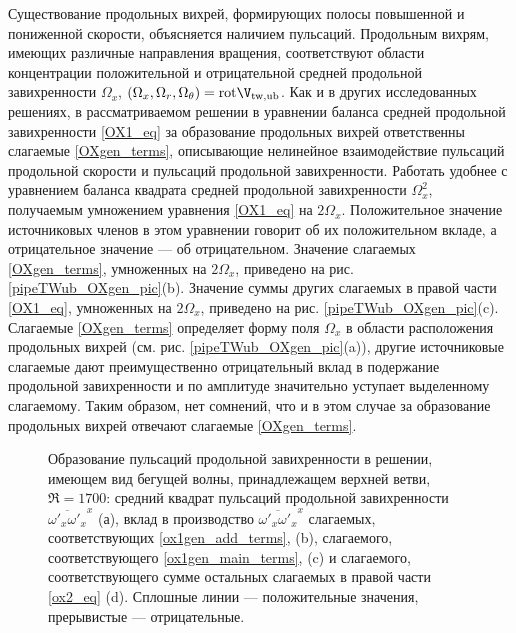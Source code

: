 Существование продольных вихрей, формирующих полосы повышенной и пониженной скорости, объясняется наличием пульсаций. Продольным вихрям, имеющих различные направления вращения, соответствуют области концентрации положительной и отрицательной средней продольной завихренности $\Omega_x$, $(\Omega_x, \Omega_r, \Omega_\theta) = \mathrm{rot} \V_\mathrm{tw,ub}$. Как и в других исследованных решениях, в рассматриваемом решении в уравнении баланса средней продольной завихренности \eqref{OX1_eq} за образование продольных вихрей ответственны слагаемые \eqref{OXgen_terms}, описывающие нелинейное взаимодействие пульсаций продольной скорости и пульсаций продольной завихренности. Работать удобнее с уравнением баланса квадрата средней продольной завихренности $\Omega_x^2$, получаемым умножением уравнения \eqref{OX1_eq} на $2\Omega_x$. Положительное значение источниковых членов в этом уравнении говорит об их положительном вкладе, а отрицательное значение --- об отрицательном. Значение слагаемых \eqref{OXgen_terms}, умноженных на $2\Omega_x$, приведено на рис. \ref{pipeTWub_OXgen_pic}(b). Значение суммы других слагаемых в правой части \eqref{OX1_eq}, умноженных на $2\Omega_x$, приведено на рис. \ref{pipeTWub_OXgen_pic}(c). Слагаемые \eqref{OXgen_terms} определяет форму поля $\Omega_x$ в области расположения продольных вихрей (см. рис. \ref{pipeTWub_OXgen_pic}(a)), другие источниковые слагаемые дают преимущественно отрицательный вклад в подержание продольной завихренности и по амплитуде значительно уступает выделенному слагаемому. Таким образом, нет сомнений, что и в этом случае за образование продольных вихрей отвечают слагаемые \eqref{OXgen_terms}. 

\begin{figure}[h]
\caption{Образование пульсаций продольной завихренности в решении, имеющем вид бегущей волны, принадлежащем верхней ветви, $\Re = 1700$: средний квадрат пульсаций продольной завихренности $\overline{\omega'_x \omega'_x }^x$ (а), вклад в производство $\overline{\omega'_x \omega'_x }^x$ слагаемых, соответствующих \eqref{ox1gen_add_terms}, (b), слагаемого, соответствующего \eqref{ox1gen_main_terms}, (c) и слагаемого, соответствующего сумме остальных слагаемых в правой части \eqref{ox2_eq} (d). Сплошные линии --- положительные значения, прерывистые --- отрицательные.}
\label{pipeTWub_ox1gen_pic}
\end{figure}

